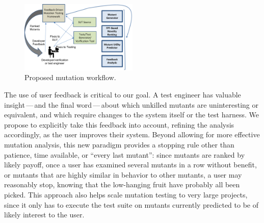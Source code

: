 \begin{figure}
\centering 
\includegraphics[width=0.5\textwidth]{TestFlow}

\caption{Proposed mutation workflow. }
\label{fig:flow}
\end{figure}



The use of user feedback is critical to our goal.  A test engineer has
valuable insight\,---\,and the final word\,---\,about which unkilled
mutants are uninteresting or equivalent, and which require changes to
the system itself or the test harness.  We propose to explicitly take
this feedback into account, refining the analysis accordingly, as the
user improves their system.  Beyond allowing for more effective
mutation analysis, this new paradigm provides a stopping rule other
than patience, time available, or ``every last mutant'': since mutants
are ranked by likely payoff, once a user has examined several mutants
in a row without benefit, or mutants that are highly similar in
behavior to other mutants, a user may reasonably stop, knowing that
the low-hanging fruit have probably all been picked.  This approach
also helps scale mutation testing to very large projects, since it
only has to execute the test suite on mutants currently predicted to
be of likely interest to the user. 

